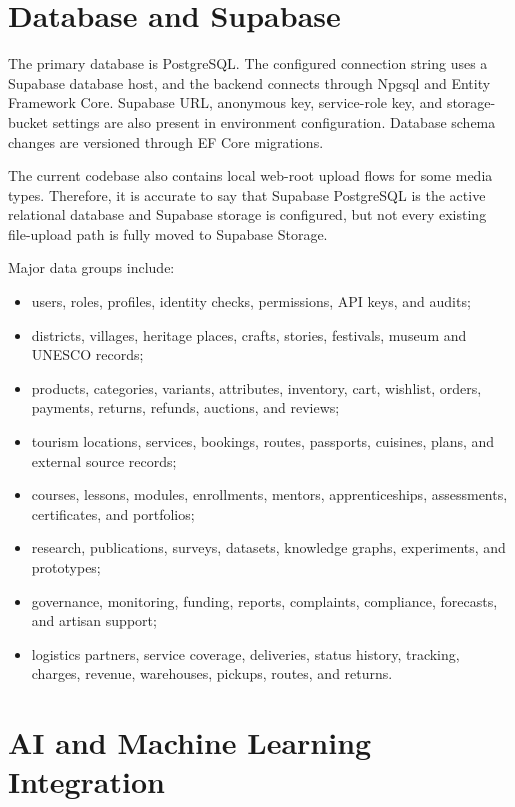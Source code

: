 \documentclass[12pt,a4paper]{report}
\begin{document}
\section{Database and Supabase}

The primary database is PostgreSQL. The configured connection string uses a Supabase database host, and the backend connects through Npgsql and Entity Framework Core. Supabase URL, anonymous key, service-role key, and storage-bucket settings are also present in environment configuration. Database schema changes are versioned through EF Core migrations.

The current codebase also contains local web-root upload flows for some media types. Therefore, it is accurate to say that Supabase PostgreSQL is the active relational database and Supabase storage is configured, but not every existing file-upload path is fully moved to Supabase Storage.

Major data groups include:

\begin{itemize}
  \item users, roles, profiles, identity checks, permissions, API keys, and audits;
  \item districts, villages, heritage places, crafts, stories, festivals, museum and UNESCO records;
  \item products, categories, variants, attributes, inventory, cart, wishlist, orders, payments, returns, refunds, auctions, and reviews;
  \item tourism locations, services, bookings, routes, passports, cuisines, plans, and external source records;
  \item courses, lessons, modules, enrollments, mentors, apprenticeships, assessments, certificates, and portfolios;
  \item research, publications, surveys, datasets, knowledge graphs, experiments, and prototypes;
  \item governance, monitoring, funding, reports, complaints, compliance, forecasts, and artisan support;
  \item logistics partners, service coverage, deliveries, status history, tracking, charges, revenue, warehouses, pickups, routes, and returns.
\end{itemize}

\section{AI and Machine Learning Integration}
\end{document}
